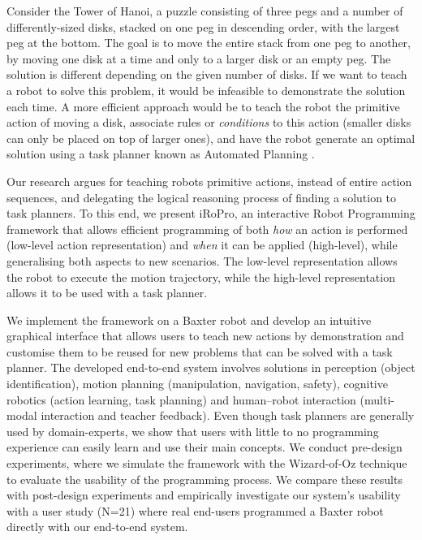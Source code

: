 Consider the Tower of Hanoi, a puzzle consisting of three pegs and a number of differently-sized disks, stacked on one peg in descending order, with the largest peg at the bottom.
The goal is to move the entire stack from one peg to another, by moving one disk at a time and only to a larger disk or an empty peg. 
The solution is different depending on the given number of disks.
If we want to teach a robot to solve this problem, it would be infeasible to demonstrate the solution each time.
A more efficient approach would be to teach the robot the primitive action of moving a disk, associate rules or \textit{conditions} to this action (\eg smaller disks can only be placed on top of larger ones), and have the robot generate an optimal solution using a task planner known as Automated Planning \cite{ghallab2004automated}.


Our research argues for teaching robots primitive actions, instead of entire action sequences, and delegating the logical reasoning process of finding a solution to task planners.
To this end, we present iRoPro, an interactive Robot Programming framework that allows efficient programming of both \textit{how} an action is performed (low-level action representation) and \textit{when} it can be applied (high-level), while generalising both aspects to new scenarios.
The low-level representation allows the robot to execute the motion trajectory, while the high-level representation allows it to be used with a task planner.

We implement the framework on a Baxter robot and develop an intuitive graphical interface that allows users to teach new actions by demonstration and customise them to be reused for new problems that can be solved with a task planner. %
The developed end-to-end system involves solutions in perception (\eg object identification), motion planning (\eg manipulation, navigation, safety), cognitive robotics (\eg action learning, task planning) and human–robot interaction (\eg multi-modal interaction and teacher feedback).
Even though task planners are generally used by domain-experts, we show that users with little to no programming experience can easily learn and use their main concepts.
We conduct pre-design experiments, where we simulate the framework with the Wizard-of-Oz technique to evaluate the usability of the programming process.
We compare these results with post-design experiments and empirically investigate our system's usability with a user study (N=21) where real end-users programmed a Baxter robot directly with our end-to-end system.


